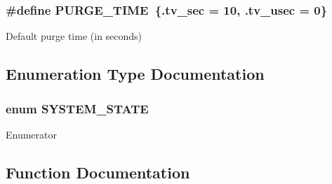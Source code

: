 \subsubsection[{P\+U\+R\+G\+E\+\_\+\+T\+I\+M\+E}]{\setlength{\rightskip}{0pt plus 5cm}\#define P\+U\+R\+G\+E\+\_\+\+T\+I\+M\+E~\{.tv\+\_\+sec = 10, .tv\+\_\+usec = 0\}}\label{global_8h_a0d3e9c7ceda276035e54d091b850c657}
Default purge time (in seconds) 

\subsection{Enumeration Type Documentation}
\subsubsection[{S\+Y\+S\+T\+E\+M\+\_\+\+S\+T\+A\+T\+E}]{\setlength{\rightskip}{0pt plus 5cm}enum {\bf S\+Y\+S\+T\+E\+M\+\_\+\+S\+T\+A\+T\+E}}\label{global_8h_afeac06fb8e1e94bfba7df88a6e219d71}
\begin{Desc}
\item[Enumerator]\par
\begin{description}
\item[{\em 
L\+E\+A\+R\+N\+I\+N\+G\label{global_8h_afeac06fb8e1e94bfba7df88a6e219d71a8a72e6f750c2628008edbe358f9d6af9}
}]\item[{\em 
D\+E\+F\+E\+N\+S\+E\label{global_8h_afeac06fb8e1e94bfba7df88a6e219d71a39aa17dada7083edfffcd66e5245e6bd}
}]\item[{\em 
A\+L\+A\+R\+M\label{global_8h_afeac06fb8e1e94bfba7df88a6e219d71ac4212312865bd8ac6810b9651d9e80df}
}]\end{description}
\end{Desc}


\subsection{Function Documentation}
